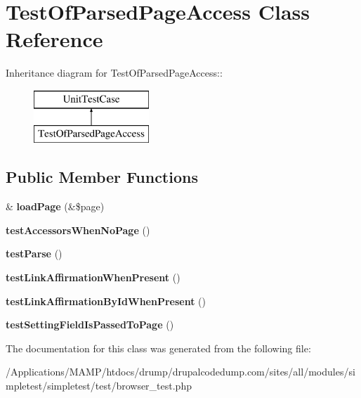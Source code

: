 \hypertarget{class_test_of_parsed_page_access}{
\section{TestOfParsedPageAccess Class Reference}
\label{class_test_of_parsed_page_access}
}
Inheritance diagram for TestOfParsedPageAccess::\begin{figure}[H]
\begin{center}
\leavevmode
\includegraphics[height=2cm]{class_test_of_parsed_page_access}
\end{center}
\end{figure}
\subsection*{Public Member Functions}
\begin{DoxyCompactItemize}
\item 
\hypertarget{class_test_of_parsed_page_access_a4469c4fe3d8b021a2b57c237d04a791a}{
\& {\bfseries loadPage} (\&\$page)}
\label{class_test_of_parsed_page_access_a4469c4fe3d8b021a2b57c237d04a791a}

\item 
\hypertarget{class_test_of_parsed_page_access_a229f86599d94a2d68ba4fce33a9c3b4b}{
{\bfseries testAccessorsWhenNoPage} ()}
\label{class_test_of_parsed_page_access_a229f86599d94a2d68ba4fce33a9c3b4b}

\item 
\hypertarget{class_test_of_parsed_page_access_a9e1955aad0ae0f401b83d476c2b20123}{
{\bfseries testParse} ()}
\label{class_test_of_parsed_page_access_a9e1955aad0ae0f401b83d476c2b20123}

\item 
\hypertarget{class_test_of_parsed_page_access_a99a475b936539575429e34c23197afb4}{
{\bfseries testLinkAffirmationWhenPresent} ()}
\label{class_test_of_parsed_page_access_a99a475b936539575429e34c23197afb4}

\item 
\hypertarget{class_test_of_parsed_page_access_a5a099ff28aac243415f26f37a87945f6}{
{\bfseries testLinkAffirmationByIdWhenPresent} ()}
\label{class_test_of_parsed_page_access_a5a099ff28aac243415f26f37a87945f6}

\item 
\hypertarget{class_test_of_parsed_page_access_af5bcff8094e3f5453e7663d7d3ca0e5e}{
{\bfseries testSettingFieldIsPassedToPage} ()}
\label{class_test_of_parsed_page_access_af5bcff8094e3f5453e7663d7d3ca0e5e}

\end{DoxyCompactItemize}


The documentation for this class was generated from the following file:\begin{DoxyCompactItemize}
\item 
/Applications/MAMP/htdocs/drump/drupalcodedump.com/sites/all/modules/simpletest/simpletest/test/browser\_\-test.php\end{DoxyCompactItemize}

